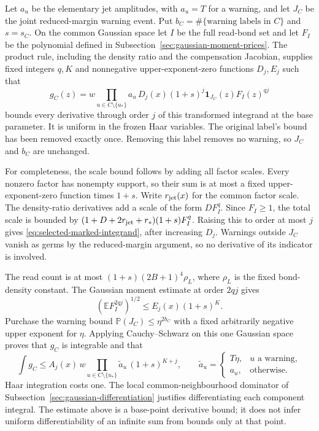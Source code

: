 Let $a_u$ be the elementary jet amplitudes, with $a_u=T$ for a
warning, and let $J_C$ be the joint reduced-margin warning event.
Put $b_C=\#\{\text{warning labels in }C\}$ and
$s=s_C$. On the common Gaussian space let $I$ be the full read-bond
set and let $F_I$ be the polynomial defined in
Subsection~\ref{sec:gaussian-moment-prices}. The product rule, including
the density ratio and the compensation Jacobian, supplies fixed
integers $q,K$ and nonnegative upper-exponent-zero functions $D_j,E_j$
such that
\begin{equation}\label{eq:selected-marked-integrand}
 g_C(z)=w\!\prod_{u\in C\setminus\{u_*\}}a_u\,
       D_j(x)(1+s)^j\mathbf1_{J_C}(z)F_I(z)^{qj}
\end{equation}
bounds every derivative through order $j$ of this transformed
integrand at the base parameter. It is uniform in the frozen Haar
variables. The original label's bound has been removed exactly once.
Removing this label removes no warning, so $J_C$ and $b_C$ are
unchanged.

For completeness, the scale bound follows by adding all factor
scales. Every nonzero factor has nonempty support, so their sum is
at most a fixed upper-exponent-zero function times $1+s$.
Write $r_{\rm jet}(x)$ for the common factor scale.
The density-ratio derivatives add a scale of the form $D F_I^q$.
Since $F_I\ge1$, the total scale is bounded by
$(1+D+2r_{\rm jet}+r_*)(1+s)F_I^q$. Raising this to order at most $j$ gives
\eqref{eq:selected-marked-integrand}, after increasing $D_j$.
Warnings outside $J_C$ vanish as germs by the reduced-margin argument,
so no derivative of its indicator is involved.

The read count is at most $(1+s)(2B+1)^4\rho_L$, where $\rho_L$
is the fixed bond-density constant. The Gaussian moment estimate at
order $2qj$ gives
\[
 (\mathbb E F_I^{2qj})^{1/2}\le E_j(x)(1+s)^K.
\]
Purchase the warning bound $\mathbb P(J_C)\le\eta^{2b_C}$ with
a fixed arbitrarily negative upper exponent for $\eta$. Applying
Cauchy--Schwarz on this one Gaussian space proves that $g_C$ is
integrable and that
\begin{equation}\label{eq:selected-marked-integral}
 \int g_C\le A_j(x)\,w
       \prod_{u\in C\setminus\{u_*\}}\widetilde a_u\,
                    (1+s)^{K+j},
 \qquad \widetilde a_u=
 \begin{cases}T\eta,&u\text{ a warning},\\a_u,&\text{otherwise}.
 \end{cases}
\end{equation}
Haar integration costs one. The local common-neighbourhood dominator
of Subsection~\ref{sec:gaussian-differentiation} justifies differentiating
each component integral. The estimate above is a base-point derivative
bound; it does not infer uniform differentiability of an infinite sum
from bounds only at that point.


